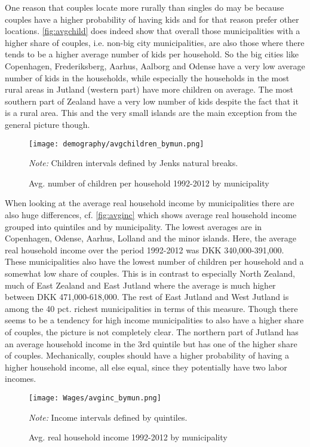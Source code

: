 One reason that couples locate more rurally than singles do may be because couples have a higher probability of having kids and for that reason prefer other locations. \autoref{fig:avgchild} does indeed show that overall those municipalities with a higher share of couples, i.e. non-big city municipalities, are also those where there tends to be a higher average number of kids per household. So the big cities like Copenhagen, Frederiksberg, Aarhus, Aalborg and Odense have a very low average number of kids in the households, while especially the households in the most rural areas in Jutland (western part) have more children on average. The most southern part of Zealand have a very low number of kids despite the fact that it is a rural area. This and the very small islands are the main exception from the general picture though.
\begin{figure}[!htb]
\centering
\begin{minipage}{0.8\textwidth}
\texttt{[image: demography/avgchildren\_bymun.png]} 
{\tiny \emph{Note:} Children intervals defined by Jenks natural breaks. \par}
\end{minipage}
\caption{Avg. number of children per household 1992-2012 by municipality}
\label{fig:avgchild}
\end{figure}

When looking at the average real household income by municipalities there are also huge differences, cf. \autoref{fig:avginc} which shows average real household income grouped into quintiles and by municipality. The lowest averages are in Copenhagen, Odense, Aarhus, Lolland and the minor islands. Here, the average real household income over the period 1992-2012 was DKK 340,000-391,000. These municipalities also have the lowest number of children per household and a somewhat low share of couples. This is in contrast to especially North Zealand, much of East Zealand and East Jutland where the average is much higher between DKK 471,000-618,000. The rest of East Jutland and West Jutland is among the 40 pct. richest municipalities in terms of this measure. Though there seems to be a tendency for high income municipalities to also have a higher share of couples, the picture is not completely clear. The northern part of Jutland has an average household income in the 3rd quintile but has one of the higher share of couples. Mechanically, couples should have a higher probability of having a higher household income, all else equal, since they potentially have two labor incomes. 
\begin{figure}[!htb]
\centering
\begin{minipage}{0.8\textwidth}
\texttt{[image: Wages/avginc\_bymun.png]} 
{\tiny \emph{Note:} Income intervals defined by quintiles. \par}
\end{minipage}
\caption{Avg. real household income 1992-2012 by municipality}
\label{fig:avginc}
\end{figure}

